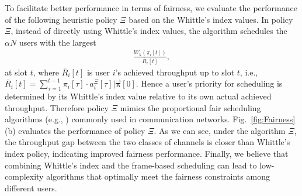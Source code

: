 \documentclass[11pt,twocolumn]{IEEEtran}
\begin{document}
To facilitate better performance in terms of fairness, we evaluate the performance of the following heuristic policy $\Xi$ based on the Whittle's index values. In policy $\Xi$, instead of directly using Whittle's index values, the algorithm schedules the $\alpha N$ users with the largest
\begin{align*}
\frac{W_k(\pi_i[t])}{\overline{R}_i[t]},
\end{align*}
at slot $t$, where $\overline{R}_i[t]$ is user $i$'s achieved throughput up to slot $t$, i.e., $\overline{R}_i[t]=\sum_{\tau=1}^{t-1}\pi_i[\tau]\cdot a_i^{\Xi}[\tau]\big | \vec{\bm\pi}[0]$. Hence a user's priority for scheduling is determined by its Whittle's index value relative to its own actual achieved throughput. Therefore policy $\Xi$ mimics the proportional fair scheduling algorithms (e.g.,  \cite{Tse}) commonly used in communication networks. Fig.~\ref{fig:Fairness}(b) evaluates the performance of policy $\Xi$. As we can see, under the algorithm $\Xi$, the throughput gap between the two classes of channels is closer than Whittle's index policy, indicating improved fairness performance. Finally, we believe that combining Whittle's index and the frame-based scheduling \cite{Neely_utility} can lead to  low-complexity algorithms that optimally meet the fairness constraints among different users.
\end{document}
